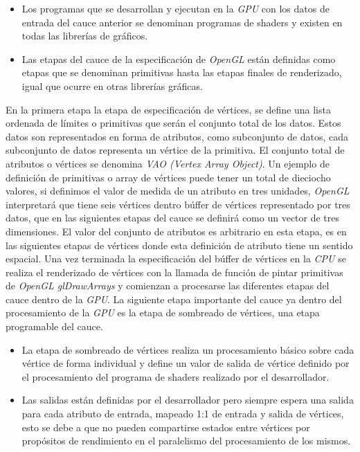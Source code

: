 \documentclass[a4paper]{book}
\begin{document}
\begin{itemize}
  \item Los programas que se desarrollan y ejecutan en la \textit{GPU} con los datos de entrada del cauce anterior se denominan programas
  de shaders y existen en todas las librerías de gráficos.

  \item Las etapas del cauce de la especificación de \textit{OpenGL} están definidas como etapas que se denominan primitivas hasta las etapas
  finales de renderizado, igual que ocurre en otras librerías gráficas.
\end{itemize}

En la primera etapa la etapa de especificación de vértices, se define una lista ordenada de límites o primitivas que serán el conjunto
total de los datos. Estos datos son representados en forma de atributos, como subconjunto de datos, cada subconjunto de datos
representa un vértice de la primitiva. El conjunto total de atributos o vértices se denomina \textit{VAO (Vertex Array Object)}.
Un ejemplo de definición de primitivas o array de vértices puede tener un total de dieciocho valores, si definimos el valor de medida
de un atributo en tres unidades, \textit{OpenGL} interpretará que tiene seis vértices dentro búffer de vértices representado por tres
datos, que en las siguientes etapas del cauce se definirá como un vector de tres dimensiones. El valor del conjunto de atributos es
arbitrario en esta etapa, es en las siguientes etapas de vértices donde esta definición de atributo tiene un sentido espacial. Una vez
terminada la especificación del búffer de vértices en la \textit{CPU} se realiza el renderizado de vértices con la llamada de función
de pintar primitivas de \textit{OpenGL glDrawArrays} y comienzan a procesarse las diferentes etapas del cauce dentro de
la \textit{GPU}. La siguiente etapa importante del cauce ya dentro del procesamiento de la \textit{GPU} es la etapa de sombreado
de vértices, una etapa programable del cauce.

\begin{itemize}
  \item La etapa de sombreado de vértices realiza un procesamiento básico sobre cada vértice de forma individual y define un valor
  de salida de vértice definido por el procesamiento del programa de shaders realizado por el desarrollador.

  \item Las salidas están definidas por el desarrollador pero siempre espera una salida para cada atributo de entrada, mapeado 1:1
  de entrada y salida de vértices, esto se debe a que no pueden compartirse estados entre vértices por propósitos de rendimiento
  en el paralelismo del procesamiento de los mismos.
\end{itemize}
\end{document}
